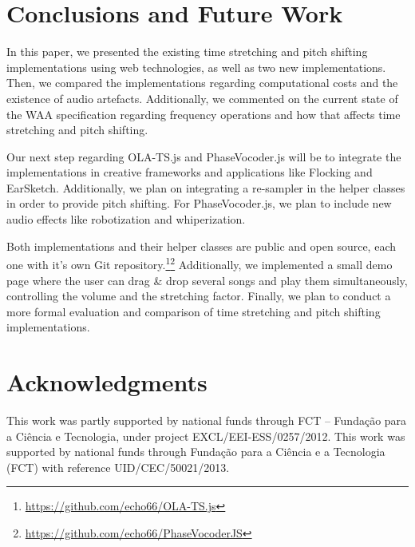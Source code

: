 \documentclass{sig-alternate}
\begin{document}
\section{Conclusions and Future Work}
\begin{sloppypar}
In this paper, we presented the existing time stretching and pitch shifting implementations using web technologies, as well as two new implementations. Then, we compared the implementations regarding computational costs and the existence of audio artefacts. Additionally, we commented on the current state of the WAA specification regarding frequency operations and how that affects time stretching and pitch shifting.

Our next step regarding OLA-TS.js and PhaseVocoder.js will be to integrate the implementations in creative frameworks and applications like Flocking and EarSketch. Additionally, we plan on integrating a re-sampler in the helper classes in order to provide pitch shifting. For PhaseVocoder.js, we plan to include new audio effects like robotization and whiperization.

Both implementations and their helper classes are public and open source, each one with it's own Git repository.\footnote{\url{https://github.com/echo66/OLA-TS.js}}\footnote{\url{https://github.com/echo66/PhaseVocoderJS}} Additionally, we implemented a small demo page where the user can drag \& drop several songs and play them simultaneously, controlling the volume and the stretching factor. Finally, we plan to conduct a more formal evaluation and comparison of time stretching and pitch shifting implementations.
\end{sloppypar}

\section{Acknowledgments}

This work was partly supported by national funds through FCT – Fundação  para a Ciência e Tecnologia, under project EXCL/EEI-ESS/0257/2012.
This work was supported by national funds through Fundação para a Ciência e a Tecnologia (FCT) with reference UID/CEC/50021/2013.

%

%
%
\balance
\end{document}
